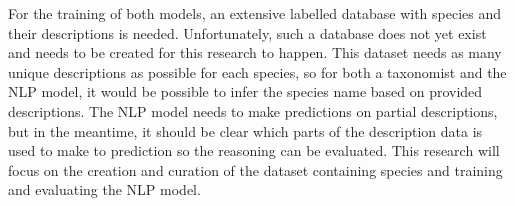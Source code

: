 \documentclass[a4paper, 12pt, oneside]{book} %
\begin{document}
For the training of both models, an extensive labelled database with species and their descriptions is needed. 
Unfortunately, such a database does not yet exist and needs to be created for this research to happen.
This dataset needs as many unique descriptions as possible for each species, so for both a taxonomist and the NLP model, it would be possible to infer the species name based on provided descriptions.
The NLP model needs to make predictions on partial descriptions, but in the meantime, it should be clear which parts of the description data is used to make to prediction so the reasoning can be evaluated.
This research will focus on the creation and curation of the dataset containing species and training and evaluating the NLP model.


\begin{comment}
Deep neural networks (DNNs) allow for remarkable performance in applications: from the automatic classification of text and images, natural language processing (NLP) to reinforcement learning.
DNNs outperform most classic machine learning approaches \autocite{he_delving_2015, brown_language_2020}.
Because of their performance, DNNs are already found quite often in a variety of products and services.
The key to their success is end-to-end training; from feature extracting to the desired result.
However, end-to-end training also results in DNNs that are difficult to interpret and explain.
Because the networks parameters are updated based on its input data, the reasoning behind the intermediate results remains challenging to understand \autocite{li_interpretable_2021, losch_interpretability_2019}.
When the reason behind DNNs' behaviour is better understood, the insights could improve their trustworthiness, performance \autocite{amershi_modeltracker_2015}, and the models can be expanded to more fields \autocite{lei_opening_2018}.

In the taxonomy, experts describe new species in the field.
Estimated is that 50\% of the species are yet to be discovered, and many species will go extinct before ever being described \autocite{lees_species_2015}.
Scalable technologies that can help monitor diversity and help discover new species are more needed than ever.
Deep learning models can help discover new species, automate and speed up this process.
Therefore, it is essential to get more insights into the reasoning of a deep learning model in sensitive fields like taxonomy; the black box behaviour of DNNs could raise issues as it hampers the trustworthiness of the models \autocite{carvalho_machine_2019}.


\end{comment}
\end{document}
